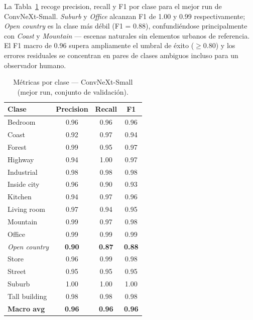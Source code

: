 La Tabla~\ref{tab:metrics-per-class} recoge precision, recall y F1 por clase para el mejor run de ConvNeXt-Small. \textit{Suburb} y \textit{Office} alcanzan F1 de 1.00 y 0.99 respectivamente; \textit{Open country} es la clase más débil (F1 = 0.88), confundiéndose principalmente con \textit{Coast} y \textit{Mountain} — escenas naturales sin elementos urbanos de referencia. El F1 macro de 0.96 supera ampliamente el umbral de éxito ($\geq 0.80$) y los errores residuales se concentran en pares de clases ambiguos incluso para un observador humano.

\begin{table}[H]
    \centering
    \caption{Métricas por clase — ConvNeXt-Small (mejor run, conjunto de validación).}
    \label{tab:metrics-per-class}
    \begin{tabular}{lccc}
        \toprule
        Clase & Precision & Recall & F1 \\
        \midrule
        Bedroom & 0.96 & 0.96 & 0.96 \\
        Coast & 0.92 & 0.97 & 0.94 \\
        Forest & 0.99 & 0.95 & 0.97 \\
        Highway & 0.94 & 1.00 & 0.97 \\
        Industrial & 0.98 & 0.98 & 0.98 \\
        Inside city & 0.96 & 0.90 & 0.93 \\
        Kitchen & 0.94 & 0.97 & 0.96 \\
        Living room & 0.97 & 0.94 & 0.95 \\
        Mountain & 0.99 & 0.97 & 0.98 \\
        Office & 0.99 & 0.99 & 0.99 \\
        \textit{Open country} & \textbf{0.90} & \textbf{0.87} & \textbf{0.88} \\
        Store & 0.96 & 0.99 & 0.98 \\
        Street & 0.95 & 0.95 & 0.95 \\
        Suburb & 1.00 & 1.00 & 1.00 \\
        Tall building & 0.98 & 0.98 & 0.98 \\
        \midrule
        \textbf{Macro avg} & \textbf{0.96} & \textbf{0.96} & \textbf{0.96} \\
        \bottomrule
    \end{tabular}
\end{table}
